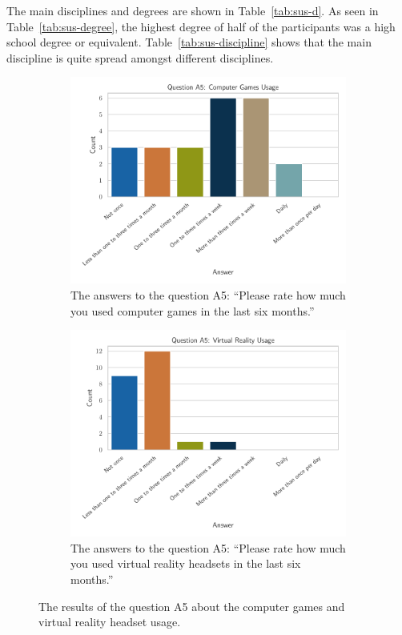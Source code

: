 The main disciplines and degrees are shown in Table~\ref{tab:sus-d}. As seen in Table~\ref{tab:sus-degree}, the highest degree of half of the participants was a high school degree or equivalent. Table~\ref{tab:sus-discipline} shows that the main discipline is quite spread amongst different disciplines.

\begin{figure}[H]
  \centering
  \begin{subfigure}{.48\linewidth}%
    \centering
    \includegraphics[width=\linewidth]{figures/evaluation/res_demo_q8_s3.pdf}
    \caption{The answers to the question A5: \enquote{Please rate how much you used computer games in the last six months.}}\label{fig:res-demo-q8-s3}
  \end{subfigure}%
  \hspace{0.03\linewidth}
  \begin{subfigure}{.48\linewidth}%
    \centering
    \includegraphics[width=\linewidth]{figures/evaluation/res_demo_q8_s4.pdf}
    \caption{The answers to the question A5: \enquote{Please rate how much you used virtual reality headsets in the last six months.}}\label{fig:res-demo-q8-s4}
  \end{subfigure}%
  \caption[Computer games and virtual reality headset usage]{The results of the question A5 about the computer games and virtual reality headset usage.}\label{fig:res-demo-q8}
\end{figure}

